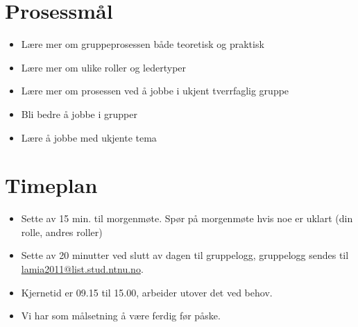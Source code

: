 \documentclass[a4paper, norsk, 12pt]{report}
\begin{document}
\section*{Prosessmål}
\begin{itemize}
\item Lære mer om gruppeprosessen både teoretisk og praktisk
\item Lære mer om ulike roller og ledertyper
\item Lære mer om prosessen ved å jobbe i ukjent tverrfaglig gruppe
\item Bli bedre å jobbe i grupper
\item Lære å jobbe med ukjente tema
\end{itemize}

\section*{Timeplan}
\begin{itemize}
\item Sette av 15 min. til morgenmøte. Spør på morgenmøte hvis noe er uklart (din rolle, andres roller)
\item Sette av 20 minutter ved slutt av dagen til gruppelogg, gruppelogg sendes
  til \\ \url{lamia2011@list.stud.ntnu.no}.
\item Kjernetid er 09.15 til 15.00, arbeider utover det ved behov.
\item Vi har som målsetning å være ferdig før påske.
\end{itemize}

\vspace{3cm}
\makebox[\textwidth][l]{
\makebox[4cm][l] {\hrulefill} \hfill 
\makebox[4cm][l] {\hrulefill} }

\vspace{1cm}
\makebox[\textwidth][l]{
\makebox[4cm][l] {\hrulefill} \hfill 
\makebox[4cm][l] {\hrulefill} }

\vspace{1cm}
\makebox[\textwidth][l]{
\makebox[4cm][l] {\hrulefill}  }
\end{document}
